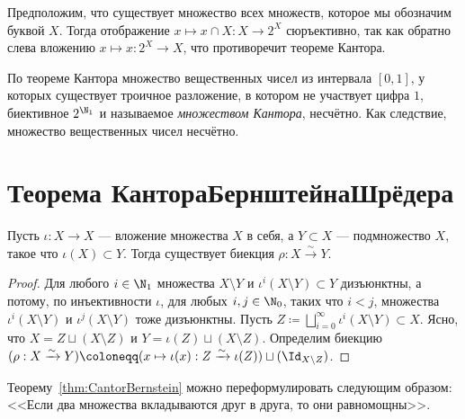 \documentclass[
	extrafontsizes,
	11pt,
	hyphens,
]{memoir}
\begin{document}
\begin{observation}
Предположим, что существует множество всех множеств, которое мы обозначим буквой \(X\).
Тогда отображение \(x \mapsto x \cap X : X \to 2^X\) сюръективно, так как обратно слева вложению \(x \mapsto x : 2^X \to X\), что противоречит теореме Кантора.
\end{observation}

\begin{observation}
По теореме Кантора множество вещественных чисел из интервала \([0,1]\), у которых существует троичное разложение, в котором не участвует цифра \(1\), биективное \(2^{\N_1}\) и называемое \emph{множеством Кантора}, несчётно. Как следствие, множество вещественных чисел несчётно.
\end{observation}


\section{Теорема Кантора\namedash{}Бернштейна\namedash{}Шрёдера}

\begin{theorem}
Пусть \(\iota : X \to X\) --- вложение множества \(X\) в себя, а \(Y \subset X\) --- подмножество \(X\), такое что \(\iota(X) \subset Y\).
\label{thm:CantorBernstein}
Тогда существует биекция \(\rho : X \xrightarrow{\sim} Y\).
\end{theorem}

\begin{proof}
Для любого \(i \in \N_1\) множества \(X \setminus Y\) и \(\iota^i(X \setminus Y) \subset Y\) дизъюнктны, а потому, по инъективности \(\iota\), для любых \(i,j \in \N_0\), таких что \(i < j\), множества \(\iota^i(X \setminus Y)\) и \(\iota^j(X \setminus Y)\) тоже дизъюнктны.
Пусть \(Z \coloneqq \bigsqcup_{i = 0}^{\infty} \iota^i(X \setminus Y) \subset X\).
Ясно, что \(X = Z \sqcup (X \setminus Z)\) и \(Y = \iota(Z) \sqcup (X \setminus Z)\).
Определим биекцию \((\rho : X \xrightarrow{\sim} Y) \coloneqq (x \mapsto \iota(x) : Z \xrightarrow{\sim} \iota(Z)) \sqcup (\Id_{X \setminus Z})\).
\end{proof}

\begin{remark}
Теорему~\ref{thm:CantorBernstein} можно переформулировать следующим образом: <<Если два множества вкладываются друг в друга, то они равномощны>>.
\end{remark}
\end{document}
